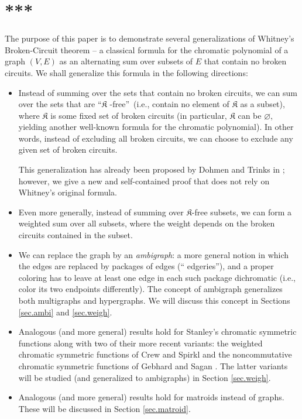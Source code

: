 \documentclass[numbers=enddot,12pt,final,onecolumn,notitlepage]{scrartcl}%
\theoremstyle{definition}
\begin{document}
\section*{***}

The purpose of this paper is to demonstrate several generalizations of
Whitney's Broken-Circuit theorem \cite[\S 7]{Whitne32} -- a classical formula
for the chromatic polynomial of a graph $\left(  V,E\right)  $ as an
alternating sum over subsets of $E$ that contain no broken circuits. We shall
generalize this formula in the following directions:

\begin{itemize}
\item Instead of summing over the sets that contain no broken circuits, we can
sum over the sets that are \textquotedblleft$\mathfrak{K}$%
-free\textquotedblright\ (i.e., contain no element of $\mathfrak{K}$ as a
subset), where $\mathfrak{K}$ is some fixed set of broken circuits (in
particular, $\mathfrak{K}$ can be $\varnothing$, yielding another well-known
formula for the chromatic polynomial). In other words, instead of excluding
all broken circuits, we can choose to exclude any given set of broken circuits.

This generalization has already been proposed by Dohmen and Trinks in
\cite[\S 3.1]{DohTri14}; however, we give a new and self-contained proof that
does not rely on Whitney's original formula.

\item Even more generally, instead of summing over $\mathfrak{K}$-free
subsets, we can form a weighted sum over all subsets, where the weight depends
on the broken circuits contained in the subset.

\item We can replace the graph by an \emph{ambigraph}: a more general notion
in which the edges are replaced by packages of edges (\textquotedblleft
edgeries\textquotedblright), and a proper coloring has to leave at least one
edge in each such package dichromatic (i.e., color its two endpoints
differently). The concept of ambigraph generalizes both multigraphs and
hypergraphs. We will discuss this concept in Sections \ref{sec.ambi} and
\ref{sec.weigh}.

\item Analogous (and more general) results hold for Stanley's chromatic
symmetric functions \cite{Stanley-chsym} along with two of their more recent
variants: the weighted chromatic symmetric functions of Crew and Spirkl
\cite{CreSpi19} and the noncommutative chromatic symmetric functions of
Gebhard and Sagan \cite{GebSag01}. The latter variants will be studied (and
generalized to ambigraphs) in Section \ref{sec.weigh}.

\item Analogous (and more general) results hold for matroids instead of
graphs. These will be discussed in Section \ref{sec.matroid}.
\end{itemize}
\end{document}
